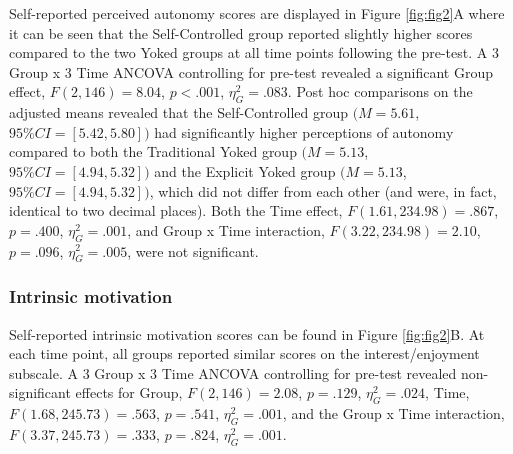 \documentclass[
  english,
  doc, donotrepeattitle,floatsintext]{apa7}
\begin{document}
Self-reported perceived autonomy scores are displayed in Figure \ref{fig:fig2}A where it can be seen that the Self-Controlled group reported slightly higher scores compared to the two Yoked groups at all time points following the pre-test. A 3 Group x 3 Time ANCOVA controlling for pre-test revealed a significant Group effect, \(F(2,146) = 8.04\), \(p < .001\), \(\eta^2_{G} = .083.\) Post hoc comparisons on the adjusted means revealed that the Self-Controlled group \((M = 5.61\), \(95\%CI =[5.42,5.80])\) had significantly higher perceptions of autonomy compared to both the Traditional Yoked group \((M = 5.13\), \(95\%CI = [4.94,5.32])\) and the Explicit Yoked group \((M = 5.13\), \(95\%CI = [4.94,5.32])\), which did not differ from each other (and were, in fact, identical to two decimal places). Both the Time effect, \(F(1.61,234.98) = .867\), \(p = .400\), \(\eta^2_{G} = .001\), and Group x Time interaction, \(F(3.22,234.98) = 2.10\), \(p = .096\), \(\eta^2_{G} = .005\), were not significant.

\hypertarget{intrinsic-motivation}{%
\subsubsection{Intrinsic motivation}\label{intrinsic-motivation}}

Self-reported intrinsic motivation scores can be found in Figure \ref{fig:fig2}B. At each time point, all groups reported similar scores on the interest/enjoyment subscale. A 3 Group x 3 Time ANCOVA controlling for pre-test revealed non-significant effects for Group, \(F(2,146) = 2.08\), \(p = .129\), \(\eta^2_{G} = .024\), Time, \(F(1.68,245.73) = .563\), \(p = .541\), \(\eta^2_{G} = .001\), and the Group x Time interaction, \(F(3.37,245.73) = .333\), \(p = .824\), \(\eta^2_{G} = .001\).
\end{document}
